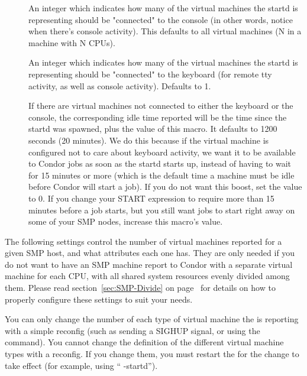 \begin{description}

\item[] 
\label{param:VirtualMachinesConnectedToConsole}
  An integer which indicates how many of the virtual
  machines the startd is representing should be "connected" to the
  console (in other words, notice when there's console activity).
  This defaults to all virtual machines (N in a machine with N CPUs).

\item[]
\label{param:VirtualMachinesConnectedToKeyboard}
  An integer which indicates how many of the virtual
  machines the startd is representing should be "connected" to the
  keyboard (for remote tty activity, as well as console activity).
  Defaults to 1.

\item[]
\label{param:DisconnectedKeyboardIdleBoost}
  If there are virtual machines not connected to either the keyboard
  or the console, the corresponding idle time reported will be the
  time since the startd was spawned, plus the value of this macro.
  It defaults to 1200 seconds (20 minutes). 
  We do this because if the virtual machine is configured not to care
  about keyboard activity, we want it to be available to Condor jobs
  as soon as the startd starts up, instead of having to wait for 15
  minutes or more (which is the default time a machine must be idle
  before Condor will start a job).
  If you do not want this boost, set the value to 0.  
  If you change your START expression to require more than 15 minutes
  before a job starts, but you still want jobs to start right away on
  some of your SMP nodes, increase this macro's value.

\end{description}

The following settings control the number of virtual machines reported
for a given SMP host, and what attributes each one has.  
They are only needed if you do not want to have an SMP machine report
to Condor with a separate virtual machine for each CPU, with all
shared system resources evenly divided among them.
Please read section~\ref{sec:SMP-Divide} on
page~\pageref{sec:SMP-Divide} for details on how to properly configure
these settings to suit your needs.

\Note You can only change the number of each type of virtual machine
the  is reporting with a simple reconfig (such as
sending a SIGHUP signal, or using the  command).
You cannot change the definition of the different virtual machine
types with a reconfig.  
If you change them, you must restart the  for the
change to take effect (for example, using ``
-startd'').

